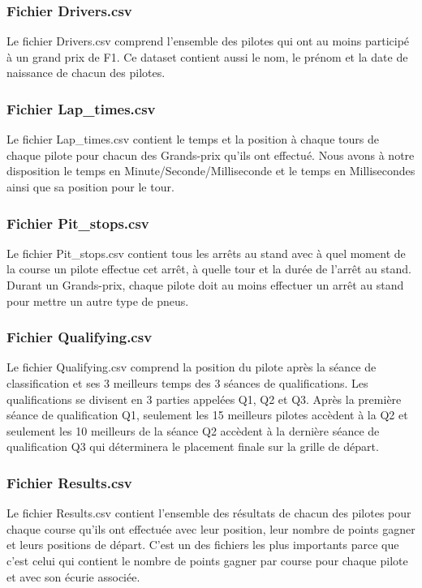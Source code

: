\subsubsection{Fichier Drivers.csv}
Le fichier Drivers.csv comprend l'ensemble des pilotes qui ont au moins participé à un grand prix de F1. Ce dataset contient aussi le nom, le prénom et la date de naissance de chacun des pilotes.

\subsubsection{Fichier Lap\_times.csv}
Le fichier Lap\_times.csv contient le temps et la position à chaque tours de chaque pilote pour chacun des Grands-prix qu'ils ont effectué. Nous avons à notre disposition le temps en Minute/Seconde/Milliseconde et le temps en Millisecondes ainsi que sa position pour le tour.

\subsubsection{Fichier Pit\_stops.csv}
Le fichier Pit\_stops.csv contient tous les arrêts au stand avec à quel moment de la course un pilote effectue cet arrêt, à quelle tour et la durée de l'arrêt au stand. Durant un Grands-prix, chaque pilote doit au moins effectuer un arrêt au stand pour mettre un autre type de pneus.

\subsubsection{Fichier Qualifying.csv}
Le fichier Qualifying.csv comprend la position du pilote après la séance de classification et ses 3 meilleurs temps des 3 séances de qualifications. Les qualifications se divisent en 3 parties appelées Q1, Q2 et Q3. Après la première séance de qualification Q1, seulement les 15 meilleurs pilotes accèdent à la Q2 et seulement les 10 meilleurs de la séance Q2 accèdent à la dernière séance de qualification Q3 qui déterminera le placement finale sur la grille de départ.

\subsubsection{Fichier Results.csv}
Le fichier Results.csv contient l'ensemble des résultats de chacun des pilotes pour chaque course qu'ils ont effectuée avec leur position, leur nombre de points gagner et leurs positions de départ. C'est un des fichiers les plus importants parce que c'est celui qui contient le nombre de points gagner par course pour chaque pilote et avec son écurie associée.

